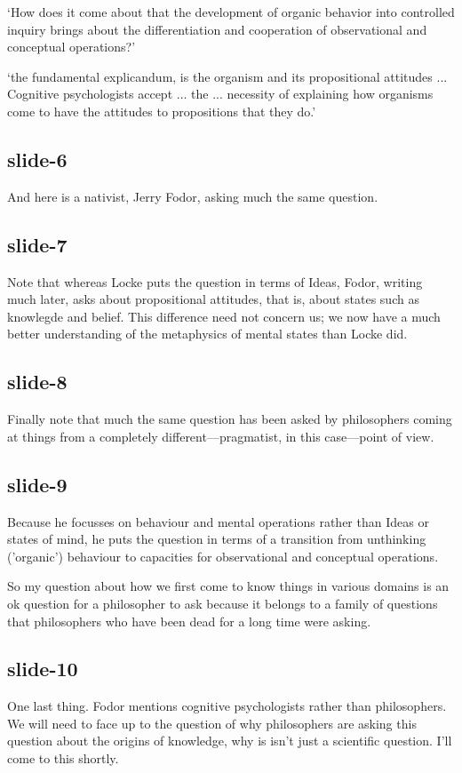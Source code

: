 \documentclass[12pt,\papersize]{extarticle}
\begin{document}
‘How does it come about that the development of organic behavior into controlled inquiry brings about the differentiation and cooperation of observational and conceptual operations?’
\citep[p.\ 12]{Dewey:1938yp}
\citep[p.\ 12]{Dewey:1938yp}

‘the fundamental explicandum, is the organism and its propositional attitudes ... Cognitive psychologists accept ... the  ... necessity of explaining how organisms come to have the attitudes to propositions that they do.’
\citep[p.\ 198]{Fodor:1975pb}
\citep[p.\ 198]{Fodor:1975pb}

\subsection{slide-6}
And here is a nativist, Jerry Fodor, asking much the same question.

\subsection{slide-7}
Note that whereas Locke puts the question in terms of Ideas, Fodor, writing much later,
asks about propositional attitudes, that is, about states such as knowlegde and belief.
This difference need not concern us; we now have a much better understanding of the metaphysics
of mental states than Locke did.

\subsection{slide-8}
Finally note that much the same question has been asked by philosophers coming at things from a
completely different---pragmatist, in this case---point of view.

\subsection{slide-9}
Because he focusses on behaviour and mental operations rather than Ideas or states of mind,
he puts the question in terms of a transition from unthinking ('organic') behaviour
to capacities for observational and conceptual operations.

So my question about how we first come to know things in various domains is an ok question
for a philosopher to ask because it belongs to a family of questions that philosophers who
have been dead for a long time were asking.

\subsection{slide-10}
One last thing.
Fodor mentions cognitive psychologists rather than philosophers.  We will need to face up to
the question of why philosophers are asking this question about the origins of knowledge, why
is isn't just a scientific question.  I'll come to this shortly.
\end{document}
